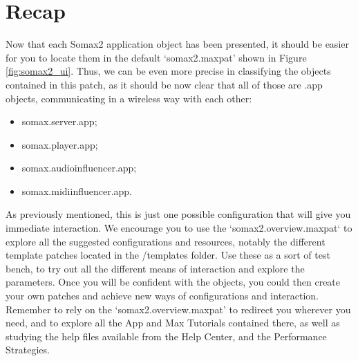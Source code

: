 \section{Recap}

Now that each Somax2 application object has been presented, it should be easier for you to locate them in the default `somax2.maxpat' shown in Figure \ref{fig:somax2_ui}. 
Thus, we can be even more precise in classifying the objects contained in this patch, as it should be now clear that all of those are .app objects, communicating in a wireless way with each other:

\begin{itemize}
    \item somax.server.app;
    \item somax.player.app;
    \item somax.audioinfluencer.app;
    \item somax.midiinfluencer.app.
\end{itemize}

\noindent As previously mentioned, this is just one possible configuration that will give you immediate interaction. We encourage you to use the `somax2.overview.maxpat` to explore all the suggested configurations and resources, notably the different template patches located in the /templates folder. Use these as a sort of test bench, to try out all the different means of interaction and explore the parameters. Once you will be confident with the objects, you could then create your own patches and achieve new ways of configurations and interaction.
Remember to rely on the `somax2.overview.maxpat' to redirect you wherever you need, and to explore all the App and Max Tutorials contained there, as well as studying the help files available from the Help Center, and the Performance Strategies.

